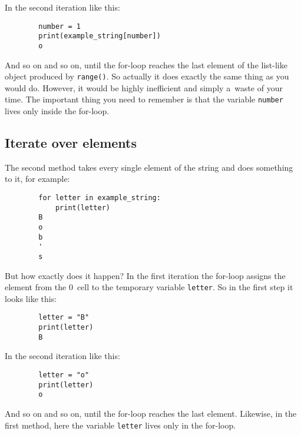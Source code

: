 \documentclass{article}
\begin{document}
\noindent In the second iteration like this:

\begin{center}
    \begin{verbatim}
        number = 1
        print(example_string[number])
        o
    \end{verbatim}
\end{center}

\noindent And so on and so on, until the for-loop reaches the last element of the list-like object produced by \texttt{range()}. So actually it does exactly the same thing as you would do. However, it would be highly inefficient and simply a~waste of your time. The important thing you need to remember is that the variable \texttt{number} lives only inside the for-loop.

\subsection*{Iterate over elements}
The second method takes every single element of the string and does something to it, for example:
\begin{center}
    \begin{verbatim}
        for letter in example_string:
            print(letter)
        B
        o
        b
        '
        s
    \end{verbatim}
\end{center}
\noindent But how exactly does it happen? In the first iteration the for-loop assigns the element from the 0~cell to the temporary variable \texttt{letter}. So in the first step it looks like this:

\begin{center}
    \begin{verbatim}
        letter = "B"
        print(letter)
        B
    \end{verbatim}
\end{center}
\noindent In the second iteration like this:
\begin{center}
    \begin{verbatim}
        letter = "o"
        print(letter)
        o
    \end{verbatim}
\end{center}
\noindent And so on and so on, until the for-loop reaches the last element. Likewise, in the first method, here the variable \texttt{letter} lives only in the for-loop.
\end{document}
